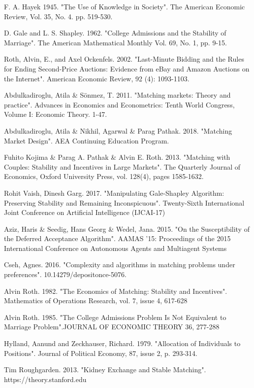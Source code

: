 \documentclass[a4paper]{article} %
\begin{document}
\begin{thebibliography}{9}

 F. A. Hayek 1945. "The Use of Knowledge in Society". The American Economic Review, Vol. 35, No. 4. pp. 519-530.

 D. Gale and L. S. Shapley. 1962. "College Admissions and the Stability of Marriage". The American Mathematical Monthly Vol. 69, No. 1, pp. 9-15.

 Roth, Alvin, E., and Axel Ockenfels. 2002. "Last-Minute Bidding and the Rules for Ending Second-Price Auctions: Evidence from eBay and Amazon Auctions on the Internet". American Economic Review, 92 (4): 1093-1103. 

 Abdulkadiroglu, Atila \& Sönmez, T. 2011. "Matching markets: Theory and practice". Advances in Economics and Econometrics: Tenth World Congress, Volume I: Economic Theory. 1-47.

 Abdulkadiroglu, Atila \& Nikhil, Agarwal \& Parag Pathak. 2018. "Matching Market Design". AEA Continuing Education Program.

 Fuhito Kojima \& Parag A. Pathak \& Alvin E. Roth. 2013. "Matching with Couples: Stability and Incentives in Large Markets". The Quarterly Journal of Economics, Oxford University Press, vol. 128(4), pages 1585-1632.

 Rohit Vaish, Dinesh Garg. 2017. "Manipulating Gale-Shapley Algorithm: Preserving Stability and Remaining Inconspicuous". Twenty-Sixth International Joint Conference on Artificial Intelligence (IJCAI-17)

 Aziz, Haris \& Seedig, Hans Georg \& Wedel, Jana. 2015. "On the Susceptibility of the Deferred Acceptance Algorithm". AAMAS '15: Proceedings of the 2015 International Conference on Autonomous Agents and Multiagent Systems

 Cseh, Agnes. 2016. "Complexity and algorithms in matching problems under preferences". 10.14279/depositonce-5076.

 Alvin Roth. 1982. "The Economics of Matching: Stability and Incentives". Mathematics of Operations Research, vol. 7, issue 4, 617-628

 Alvin Roth. 1985. "The College Admissions Problem Is Not Equivalent to Marriage Problem".JOURNAL OF ECONOMIC THEORY 36, 277-288

 Hylland, Aanund and Zeckhauser, Richard. 1979. "Allocation of Individuals to Positions". Journal of Political Economy, 87, issue 2, p. 293-314.

 Tim Roughgarden. 2013. "Kidney Exchange and Stable Matching". https://theory.stanford.edu



\end{thebibliography}
\end{document}
